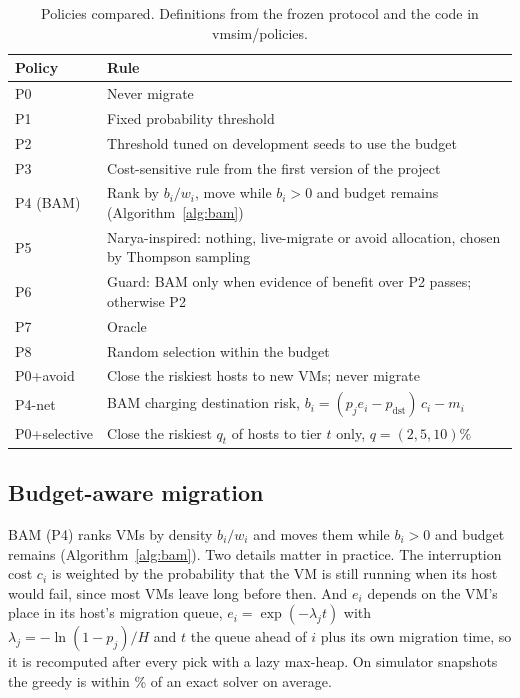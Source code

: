 \documentclass[pdflatex,sn-mathphys-num,iicol]{sn-jnl}
\theoremstyle{thmstyleone}%
\theoremstyle{thmstylethree}%
\begin{document}
\begin{table}[!t]\centering
\caption{Policies compared. Definitions from the frozen protocol and the code in
vmsim/policies.}
\label{tab:policies}
\footnotesize
\begin{tabular}{lp{}}\toprule
Policy & Rule \\ \midrule
P0 & Never migrate \\
P1 & Fixed probability threshold \\
P2 & Threshold tuned on development seeds to use the budget \\
P3 & Cost-sensitive rule from the first version of the project \\
P4 (BAM) & Rank by $b_i/w_i$, move while $b_i>0$ and budget remains (Algorithm~\ref{alg:bam}) \\
P5 & Narya-inspired: nothing, live-migrate or avoid allocation, chosen by Thompson sampling \\
P6 & Guard: BAM only when evidence of benefit over P2 passes; otherwise P2 \\
P7 & Oracle \\
P8 & Random selection within the budget \\ \midrule
P0+avoid & Close the riskiest hosts to new VMs; never migrate \\
P4-net & BAM charging destination risk, $b_i = (p_j e_i - p_{\mathrm{dst}})\,c_i - m_i$ \\
P0+selective & Close the riskiest $q_t$ of hosts to tier $t$ only, $q=(2,5,10)\%$ \\
\bottomrule\end{tabular}
\end{table}

\subsection{Budget-aware migration}\label{sec:bam}

BAM (P4) ranks VMs by density $b_i/w_i$ and moves them while $b_i > 0$ and budget remains
(Algorithm~\ref{alg:bam}). Two details matter in practice. The interruption cost $c_i$ is weighted
by the probability that the VM is still running when its host would fail, since most VMs leave
long before then. And $e_i$ depends on the VM's place in its host's migration queue,
$e_i = \exp(-\lambda_j t)$ with $\lambda_j = -\ln(1-p_j)/H$ and $t$ the queue ahead of $i$ plus its
own migration time, so it is recomputed after every pick with a lazy max-heap. On simulator
snapshots the greedy is within \VBamExactGap\% of an exact solver on average.
\end{document}
